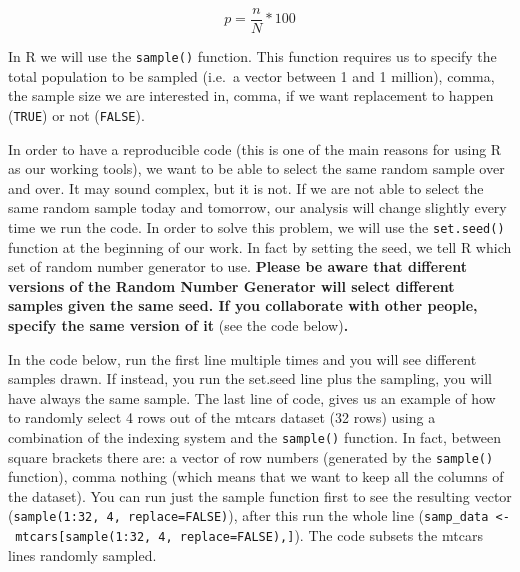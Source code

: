 \documentclass[
]{article}
\begin{document}
\begin{equation}
p=\frac{n}{N}*100
\label{eq:srs}
\end{equation}

In R we will use the \texttt{sample()} function. This function requires us to
specify the total population to be sampled (i.e.~a vector between 1 and
1 million), comma, the sample size we are interested in, comma, if we
want replacement to happen (\texttt{TRUE}) or not (\texttt{FALSE}).

In order to have a reproducible code (this is one of the main reasons
for using R as our working tools), we want to be able to select the same
random sample over and over. It may sound complex, but it is not. If we
are not able to select the same random sample today and tomorrow, our
analysis will change slightly every time we run the code. In order to
solve this problem, we will use the \texttt{set.seed()} function at the
beginning of our work. In fact by setting the seed, we tell R which set
of random number generator to use. \textbf{Please be aware that different
versions of the Random Number Generator will select different samples
given the same seed. If you collaborate with other people, specify the
same version of it} (see the code below)\textbf{.}

In the code below, run the first line multiple times and you will see
different samples drawn. If instead, you run the set.seed line plus the
sampling, you will have always the same sample. The last line of code,
gives us an example of how to randomly select 4 rows out of the mtcars
dataset (32 rows) using a combination of the indexing system and the
\texttt{sample()} function. In fact, between square brackets there are: a
vector of row numbers (generated by the \texttt{sample()} function), comma
nothing (which means that we want to keep all the columns of the
dataset). You can run just the sample function first to see the
resulting vector (\texttt{sample(1:32,\ 4,\ replace=FALSE)}), after this run the
whole line (\texttt{samp\_data\ \textless{}-\ mtcars{[}sample(1:32,\ 4,\ replace=FALSE),{]}}). The
code subsets the mtcars lines randomly sampled.
\end{document}
